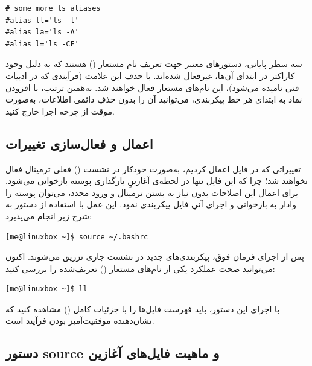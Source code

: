 \begin{latin}
\begin{lstlisting}
# some more ls aliases
#alias ll='ls -l'
#alias la='ls -A'
#alias l='ls -CF'
\end{lstlisting}
\end{latin}

سه سطر پایانی، دستورهای معتبر جهت تعریف نام مستعار () هستند که به دلیل وجود کاراکتر \cmd{\#} در ابتدای آن‌ها، غیرفعال شده‌اند. با حذف این علامت (فرآیندی که در ادبیات فنی  نامیده می‌شود)، این نام‌های مستعار فعال خواهند شد. به‌همین ترتیب، با افزودن نماد \cmd{\#} به ابتدای هر خط پیکربندی، می‌توانید آن را بدون حذفِ دائمی اطلاعات، به‌صورت موقت از چرخه اجرا خارج کنید.

\subsection{اعمال و فعال‌سازی تغییرات}

تغییراتی که در فایل  اعمال کردیم، به‌صورت خودکار در نشست () فعلی ترمینال فعال نخواهند شد؛ چرا که این فایل تنها در لحظه‌ی آغازینِ بارگذاری پوسته بازخوانی می‌شود. برای اعمال این اصلاحات بدون نیاز به بستن ترمینال و ورود مجدد، می‌توان پوسته  را وادار به بازخوانی و اجرای آنیِ فایل پیکربندی نمود. این عمل با استفاده از دستور  به شرح زیر انجام می‌پذیرد:

\begin{latin}
\begin{lstlisting}
[me@linuxbox ~]$ source ~/.bashrc
\end{lstlisting}
\end{latin}

پس از اجرای فرمان فوق، پیکربندی‌های جدید در نشست جاری تزریق می‌شوند. اکنون می‌توانید صحت عملکرد یکی از نام‌های مستعار () تعریف‌شده را بررسی کنید:

\begin{latin}
\begin{lstlisting}
[me@linuxbox ~]$ ll
\end{lstlisting}
\end{latin}

با اجرای این دستور، باید فهرست فایل‌ها را با جزئیات کامل () مشاهده کنید که نشان‌دهنده موفقیت‌آمیز بودن فرآیند است.

\subsection{دستور source و ماهیت فایل‌های آغازین}

